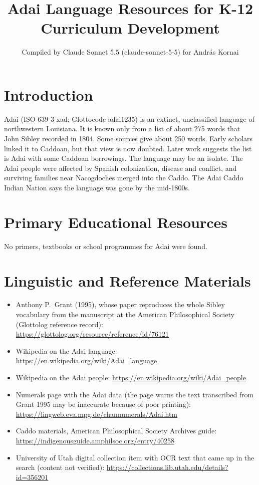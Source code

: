 \documentclass[12pt]{article}
\title{Adai Language Resources for K-12 Curriculum Development}
\author{Compiled by Claude Sonnet 5.5 (claude-sonnet-5-5) for Andr\'as Kornai}
\date{}
\begin{document}
\maketitle

\section{Introduction}
Adai (ISO 639-3 xad; Glottocode adai1235) is an extinct, unclassified language of northwestern Louisiana. It is known only from a list of about 275 words that John Sibley recorded in 1804. Some sources give about 250 words. Early scholars linked it to Caddoan, but that view is now doubted. Later work suggests the list is Adai with some Caddoan borrowings. The language may be an isolate. The Adai people were affected by Spanish colonization, disease and conflict, and surviving families near Nacogdoches merged into the Caddo. The Adai Caddo Indian Nation says the language was gone by the mid-1800s.

\section{Primary Educational Resources}
No primers, textbooks or school programmes for Adai were found.

\section{Linguistic and Reference Materials}
\begin{itemize}
\item Anthony P.\ Grant (1995), whose paper reproduces the whole Sibley vocabulary from the manuscript at the American Philosophical Society (Glottolog reference record): \url{https://glottolog.org/resource/reference/id/76121}
\item Wikipedia on the Adai language: \url{https://en.wikipedia.org/wiki/Adai_language}
\item Wikipedia on the Adai people: \url{https://en.wikipedia.org/wiki/Adai_people}
\item Numerals page with the Adai data (the page warns the text transcribed from Grant 1995 may be inaccurate because of poor printing): \url{https://lingweb.eva.mpg.de/channumerals/Adai.htm}
\item Caddo materials, American Philosophical Society Archives guide: \url{https://indigenousguide.amphilsoc.org/entry/40258}
\item University of Utah digital collection item with OCR text that came up in the search (content not verified): \url{https://collections.lib.utah.edu/details?id=356201}
\end{itemize}
\end{document}
